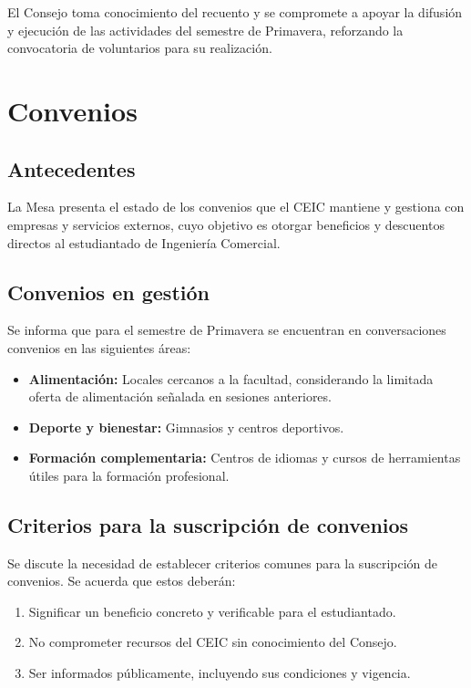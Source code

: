 \documentclass[12pt,letterpaper]{article}
\begin{document}
El Consejo toma conocimiento del recuento y se compromete a apoyar la difusión y ejecución de las actividades del semestre de Primavera, reforzando la convocatoria de voluntarios para su realización.

\section{Convenios}

\subsection{Antecedentes}

La Mesa presenta el estado de los convenios que el CEIC mantiene y gestiona con empresas y servicios externos, cuyo objetivo es otorgar beneficios y descuentos directos al estudiantado de Ingeniería Comercial.

\subsection{Convenios en gestión}

Se informa que para el semestre de Primavera se encuentran en conversaciones convenios en las siguientes áreas:

\begin{itemize}
  \item \textbf{Alimentación:} Locales cercanos a la facultad, considerando la limitada oferta de alimentación señalada en sesiones anteriores.
  \item \textbf{Deporte y bienestar:} Gimnasios y centros deportivos.
  \item \textbf{Formación complementaria:} Centros de idiomas y cursos de herramientas útiles para la formación profesional.
\end{itemize}

\subsection{Criterios para la suscripción de convenios}

Se discute la necesidad de establecer criterios comunes para la suscripción de convenios. Se acuerda que estos deberán:

\begin{enumerate}
  \item Significar un beneficio concreto y verificable para el estudiantado.
  \item No comprometer recursos del CEIC sin conocimiento del Consejo.
  \item Ser informados públicamente, incluyendo sus condiciones y vigencia.
\end{enumerate}
\end{document}
